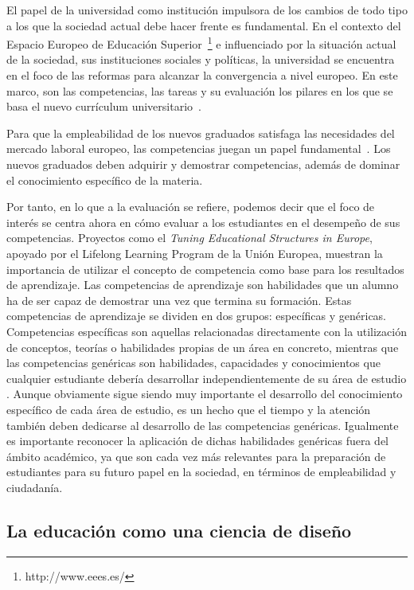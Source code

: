El papel de la universidad como institución impulsora de los cambios de todo tipo a los que la sociedad actual debe hacer frente es fundamental. En el contexto del Espacio Europeo de Educación Superior~\footnote{http://www.eees.es/} e influenciado por la situación actual de  la sociedad, sus instituciones sociales y políticas, la universidad se encuentra en el foco de las reformas para alcanzar la convergencia a nivel europeo. En este marco, son las competencias, las tareas y su evaluación los pilares en los que se basa el nuevo currículum universitario~\cite{zabala2005espacio}.

Para que la empleabilidad de los nuevos graduados satisfaga las necesidades del mercado laboral europeo, las competencias juegan un papel fundamental~\cite{communique2012making}. Los nuevos graduados deben adquirir y demostrar competencias, además de dominar el conocimiento específico de la materia.

Por tanto, en lo que a la evaluación se refiere, podemos decir que el foco de interés se centra ahora en cómo evaluar a los estudiantes en el desempeño de sus competencias. Proyectos como el \emph{Tuning Educational Structures in Europe}, apoyado por el Lifelong Learning Program de la Unión Europea, muestran la importancia de utilizar el concepto de competencia como base para los resultados de aprendizaje. Las competencias de aprendizaje son habilidades que un alumno ha de ser capaz de demostrar una vez que termina su formación. Estas competencias de aprendizaje se dividen en dos grupos: específicas y genéricas. Competencias específicas son aquellas relacionadas directamente con la utilización de conceptos, teorías o habilidades propias de un área en concreto, mientras que las competencias genéricas son habilidades, capacidades y conocimientos que cualquier estudiante debería desarrollar independientemente de su área de estudio \cite{gonzalez2003tuning}. Aunque obviamente sigue siendo muy importante el desarrollo del conocimiento específico de cada área de estudio, es un hecho que el tiempo y la atención también deben dedicarse al desarrollo de las competencias genéricas. Igualmente es importante reconocer la aplicación de dichas habilidades genéricas fuera del ámbito académico, ya que son cada vez más relevantes para la preparación de estudiantes para su futuro papel en la sociedad, en términos de empleabilidad y ciudadanía.

\subsection*{La educación como una ciencia de diseño}
\label{sec:dbr}

